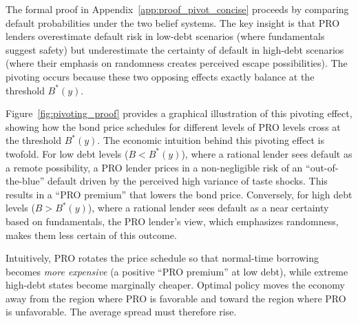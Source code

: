 \documentclass[12pt]{article}
\theoremstyle{plain}
\begin{document}
The formal proof in Appendix~\ref{app:proof_pivot_concise} proceeds by
comparing default probabilities under the two belief systems. The key insight
is that PRO lenders overestimate default risk in low-debt scenarios (where
fundamentals suggest safety) but underestimate the certainty of default in
high-debt scenarios (where their emphasis on randomness creates perceived
escape possibilities). The pivoting occurs because these two opposing effects
exactly balance at the threshold $B^*(y)$.

Figure~\ref{fig:pivoting_proof} provides a graphical illustration of this
pivoting effect, showing how the bond price schedules for different levels of
PRO levels cross at the threshold $B^*(y)$. The economic intuition behind this
pivoting effect is twofold. For low debt levels ($B<B^*(y)$), where a rational
lender sees default as a remote possibility, a PRO lender prices in a
non-negligible risk of an ``out-of-the-blue'' default driven by the perceived
high variance of taste shocks. This results in a ``PRO premium'' that lowers
the bond price. Conversely, for high debt levels ($B>B^*(y)$), where a rational
lender sees default as a near certainty based on fundamentals, the PRO lender's
view, which emphasizes randomness, makes them less certain of this outcome.

Intuitively, PRO rotates the price schedule so that normal-time borrowing
becomes \emph{more expensive} (a positive ``PRO premium'' at low debt), while
extreme high-debt states become marginally cheaper. Optimal policy moves the
economy away from the region where PRO is favorable and toward the region where
PRO is unfavorable. The average spread must therefore rise.
\end{document}
